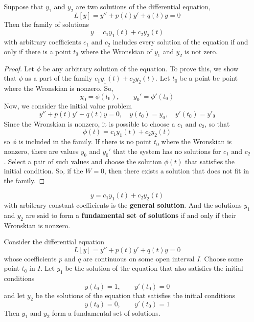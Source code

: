     \begin{theorem}
        Suppose that $y_1$ and $y_2$ are two solutions of the differential equation,
        \begin{equation*}
            L[y] = y'' + p(t)y' + q(t)y = 0
        \end{equation*}
        Then the family of solutions
        \begin{equation*}
            y = c_1y_1(t) + c_2y_2(t)
        \end{equation*}
        with arbitrary coefficients $c_1$ and $c_2$ includes every solution of the equation if and only if there is a point $t_0$ where the Wronskian of $y_1$ and $y_2$ is not zero.
    \end{theorem}
    \begin{proof}
        Let $\phi$ be any arbitrary solution of the equation. To prove this, we show that $\phi$ as a part of the family $c_1y_1(t) + c_2y_2(t)$. Let $t_0$ be a point be point where the Wronskian is nonzero. So,
        \begin{equation*}
            y_0 = \phi(t_0), \qquad y_0' = \phi'(t_0)
        \end{equation*}
        Now, we consider the initial value problem
        \begin{equation*}
            y'' + p(t)y' + q(t)y = 0, \quad y(t_0) = y_0, \quad y'(t_0) = y'_0
        \end{equation*}
        Since the Wronskian is nonzero, it is possible to choose a $c_1$ and $c_2$, so that 
        \begin{equation*}
            \phi(t) = c_1y_1(t) + c_2y_2(t) 
        \end{equation*}
        so $\phi$ is included in the family. If there is no point $t_0$ where the Wronskian is nonzero, there are values $y_0$ and $y_0'$ that the system has no solutions for $c_1$ and $c_2$. Select a pair of such values and choose the solution $\phi(t)$ that satisfies the initial condition. So, if the $W = 0$, then there exists a solution that does not fit in the family.
    \end{proof}
    \begin{equation*}
        y = c_1y_1(t) + c_2y_2(t)
    \end{equation*}
    with arbitrary constant coefficients is the \textbf{general solution}. And the solutions $y_1$ and $y_2$ are said to form a \textbf{fundamental set of solutions} if and only if their Wronskian is nonzero.
    \begin{theorem}
        Consider the differential equation
        \begin{equation*}
            L[y] = y'' + p(t)y' + q(t)y = 0
        \end{equation*}
        whose coefficients $p$ and $q$ are continuous on some open interval $I$. Choose some point $t_0$ in $I$. Let $y_1$ be the solution of the equation that also satisfies the initial conditions
        $$y(t_0) = 1, \qquad y'(t_0) = 0$$
        and let $y_2$ be the solutions of the equation that satisfies the initial conditions
        $$y(t_0) = 0, \qquad y'(t_0) = 1$$
        Then $y_1$ and $y_2$ form a fundamental set of solutions.
    \end{theorem}
